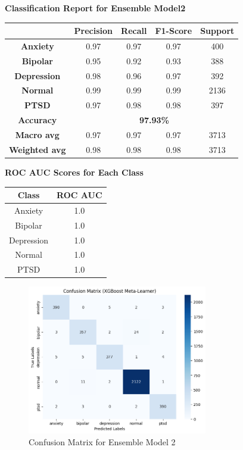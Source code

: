 \begin{center}
    \textbf{Classification Report for Ensemble Model2} \\[0.5em]
    \begin{tabular}{|c|c|c|c|c|}
        \hline
        & \textbf{Precision} & \textbf{Recall} & \textbf{F1-Score} & \textbf{Support} \\ \hline
        \textbf{Anxiety}    & 0.97 & 0.97 & 0.97 & 400  \\ \hline
        \textbf{Bipolar}    & 0.95 & 0.92 & 0.93 & 388  \\ \hline
        \textbf{Depression} & 0.98 & 0.96 & 0.97 & 392  \\ \hline
        \textbf{Normal}     & 0.99 & 0.99 & 0.99 & 2136 \\ \hline
        \textbf{PTSD}       & 0.97 & 0.98 & 0.98 & 397  \\ \hline
        \textbf{Accuracy}   & \multicolumn{4}{|c|}{\textbf{97.93\%}} \\ \hline
        \textbf{Macro avg}  & 0.97 & 0.97 & 0.97 & 3713 \\ \hline
        \textbf{Weighted avg} & 0.98 & 0.98 & 0.98 & 3713 \\ \hline
    \end{tabular}
\end{center}

\begin{center}
    \textbf{ROC AUC Scores for Each Class} \\[0.5em]
    \begin{tabular}{|c|c|}
        \hline
        \textbf{Class} & \textbf{ROC AUC} \\ \hline
        Anxiety  & 1.0 \\ \hline
        Bipolar  & 1.0 \\ \hline
        Depression & 1.0 \\ \hline
        Normal   & 1.0 \\ \hline
        PTSD     & 1.0 \\ \hline
    \end{tabular}
\end{center}

\begin{figure}[h!]  
    \centering
    \includegraphics[width=0.7\textwidth]{Images/EM2 CM.png}  
    \caption{Confusion Matrix for Ensemble Model 2}
    \label{em2 cm}  %
\end{figure}

